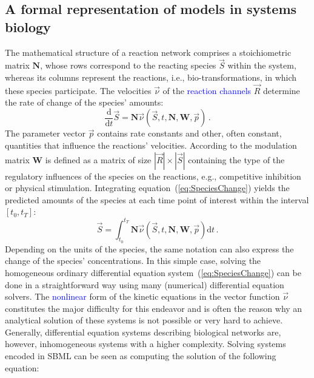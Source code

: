 \documentclass[10pt]{bmc_article}
\newenvironment{bmcformat}{\fussy\setboolean{publ}{true}}{\fussy}
\newcommand{\COR}[1]                      {\textcolor{blue}{#1}}
\newcommand{\D}{\mathrm{d}}
\begin{document}
\begin{bmcformat}
\subsection*{A formal representation of models in systems biology}

The mathematical structure of a reaction network comprises a stoichiometric
matrix $\mathbf{N}$, whose rows correspond to the reacting species $\vec{S}$
within the system, whereas its columns represent the reactions, i.e., bio-transformations,
in which these species participate.
The velocities $\vec{\nu}$ of the \COR{reaction channels} $\vec{R}$ determine the rate of
change of the species' amounts:
\begin{equation}
\frac{\D}{\D t}\vec{S} = \mathbf{N}\vec{\nu}(\vec{S}, t, \mathbf{N}, \mathbf{W}, \vec{p})\,.
\label{eq:SpeciesChange}
\end{equation}
The parameter vector $\vec{p}$ contains rate constants and other, often
constant, quantities that influence the reactions' velocities.
According to \cite{Liebermeister2006, Liebermeister2010} the modulation matrix
$\mathbf{W}$ is defined as a matrix of size $|\vec{R}|\times|\vec{S}|$
containing the type of the regulatory influences of the species on
the reactions, e.g., competitive inhibition or physical stimulation.
Integrating equation~(\ref{eq:SpeciesChange}) yields the predicted amounts of the
species at each time point of interest within the interval $[t_0, t_T]$:
\begin{equation}
\vec{S} = \int_{t_0}^{t_T} \mathbf{N}\vec{\nu}(\vec{S}, t, \mathbf{N}, \mathbf{W}, \vec{p})
\D t\,.
\end{equation}
Depending on the units of the species, the same notation can also express the
change of the species' concentrations.
In this simple case, solving the homogeneous ordinary
differential equation system~(\ref{eq:SpeciesChange}) can be done in a
straightforward way using many (numerical) differential equation solvers.
The \COR{nonlinear} form of the kinetic equations in the vector function $\vec{\nu}$
constitutes the major difficulty for this endeavor and is often the reason why
an analytical solution of these systems is not possible or very hard to achieve.
Generally, differential equation systems describing biological networks are,
however, inhomogeneous systems with a higher complexity.
Solving systems encoded in \acs{SBML} can be seen as computing the solution of the following
equation:
\end{bmcformat}
\end{document}
